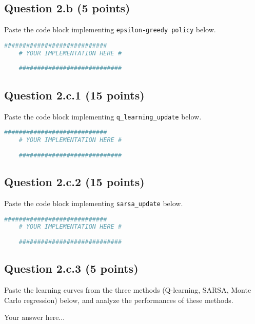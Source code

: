 \documentclass[12pt]{article}
\begin{document}
\subsection*{Question 2.b (5 points)}
Paste the code block implementing \texttt{epsilon-greedy policy} below.
            \begin{solution}
                \begin{lstlisting}[language=Python]
    ############################
    # YOUR IMPLEMENTATION HERE #
    
    ############################
                \end{lstlisting}
            \end{solution}

\subsection*{Question 2.c.1 (15 points)}
Paste the code block implementing \texttt{q\_learning\_update} below.
            \begin{solution}
                \begin{lstlisting}[language=Python]
    ############################
    # YOUR IMPLEMENTATION HERE #
    
    ############################
                \end{lstlisting}
            \end{solution}


\subsection*{Question 2.c.2 (15 points)}
Paste the code block implementing \texttt{sarsa\_update} below.
            \begin{solution}
                \begin{lstlisting}[language=Python]
    ############################
    # YOUR IMPLEMENTATION HERE #
    
    ############################
                \end{lstlisting}
            \end{solution}


\subsection*{Question 2.c.3 (5 points)}
Paste the learning curves from the three methods (Q-learning, SARSA, Monte Carlo regression) below, and analyze the performances of these methods.
\begin{solution}
Your answer here...
\end{solution}
\end{document}
